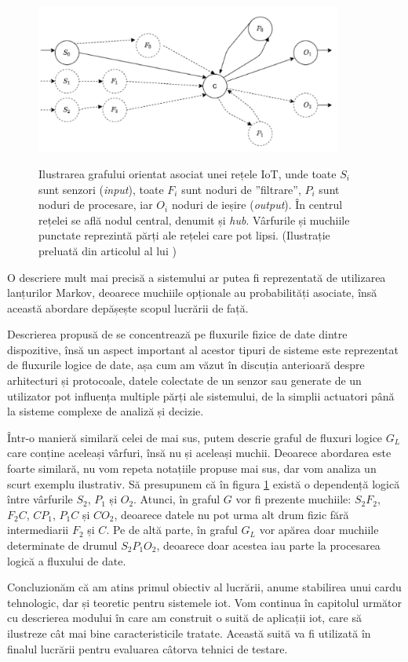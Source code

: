 \begin{figure}[h]
    \centering
    \caption{\centering Ilustrarea grafului orientat asociat unei rețele IoT, unde toate $S_i$ sunt senzori (\textit{input}), toate $F_i$ sunt noduri de ”filtrare”, $P_i$ sunt noduri de procesare, iar $O_i$ noduri de ieșire (\textit{output}). În centrul rețelei se află nodul central, denumit și \textit{hub}. Vârfurile și muchiile punctate reprezintă părți ale rețelei care pot lipsi. \newline (Ilustrație preluată din articolul  al lui \citet{Paduraru2021})}
    \includegraphics[width=0.9\textwidth]{images/river_topologie.png}
    \label{fig:river_network}
\end{figure}

O descriere mult mai precisă a sistemului ar putea fi reprezentată de utilizarea lanțurilor Markov, deoarece muchiile opționale au probabilități asociate, însă această abordare depășește scopul lucrării de față.

Descrierea propusă de \citet{Paduraru2021} se concentrează pe fluxurile fizice de date dintre dispozitive, însă un aspect important al acestor tipuri de sisteme este reprezentat de fluxurile logice de date, așa cum am văzut în discuția anterioară despre arhitecturi și protocoale, datele colectate de un senzor sau generate de un utilizator pot influența multiple părți ale sistemului, de la simplii actuatori până la sisteme complexe de analiză și decizie.

Într-o manieră similară celei de mai sus, putem descrie graful de fluxuri logice $G_L$ care conține aceleași vârfuri, însă nu și aceleași muchii. Deoarece abordarea este foarte similară, nu vom repeta notațiile propuse mai sus, dar vom analiza un scurt exemplu ilustrativ. Să presupunem că în figura \ref{fig:river_network} există o dependență logică între vârfurile $S_2$, $P_1$ și $O_2$. Atunci, în graful $G$ vor fi prezente muchiile: $S_2 F_2$, $F_2 C$, $C P_1$, $P_1 C$ și $C O_2$, deoarece datele nu pot urma alt drum fizic fără intermediarii $F_2$ și $C$. Pe de altă parte, în graful $G_L$ vor apărea doar muchiile determinate de drumul $S_2 P_1 O_2$, deoarece doar acestea iau parte la procesarea logică a fluxului de date.

Concluzionăm că am atins primul obiectiv al lucrării, anume stabilirea unui cardu tehnologic, dar și teoretic pentru sistemele \acrshort{iot}. Vom continua în capitolul următor cu descrierea modului în care am construit o suită de aplicații \acrshort{iot}, care să ilustreze cât mai bine caracteristicile tratate. Această suită va fi utilizată în finalul lucrării pentru evaluarea câtorva tehnici de testare.